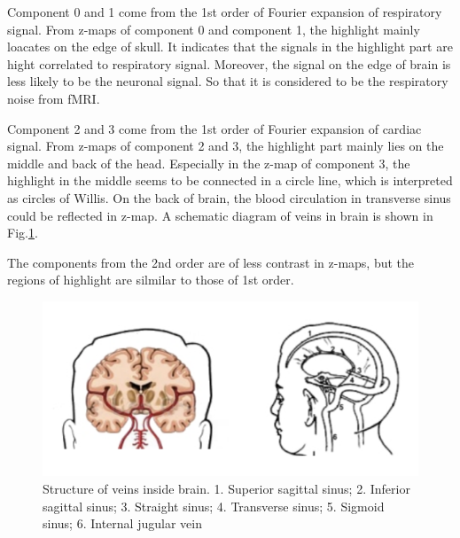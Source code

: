 Component 0 and 1 come from the 1st order of Fourier expansion of respiratory signal.
From z-maps of component 0 and component 1, the highlight mainly loacates on the edge of skull. 
It indicates that the signals in the highlight part are hight correlated to respiratory signal. Moreover,
the signal on the edge of brain is less likely to be the neuronal signal. So that it is considered to be
the respiratory noise from fMRI.

Component 2 and 3 come from the 1st order of Fourier expansion of cardiac signal.
From z-maps of component 2 and 3, the highlight part mainly lies on the middle and back of the head.
Especially in the z-map of component 3, the highlight in the middle seems to be connected in a circle line, which is 
interpreted as circles of Willis. On the back of brain, the blood circulation in transverse sinus
could be reflected in z-map. A schematic diagram of veins in brain is shown in Fig.\ref{fig:brain}.

The components from the 2nd order are of less contrast in z-maps, but the regions of highlight
are silmilar to those of 1st order.

\begin{figure}[htp]
  \centering
  \includegraphics[width=0.9\columnwidth]{Figures/brain.jpeg}
  \caption{Structure of veins inside brain. 1. Superior sagittal sinus; 2. Inferior sagittal sinus;
  3. Straight sinus; 4. Transverse sinus; 5. Sigmoid sinus; 6. Internal jugular vein   }
  \label{fig:brain}
\end{figure} 




